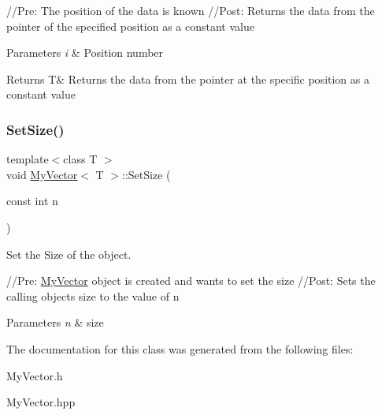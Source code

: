 //\+Pre\+: The position of the data is known //\+Post\+: Returns the data from the pointer of the specified position as a constant value 
\begin{DoxyParams}{Parameters}
{\em i} & Position number \\
\hline
\end{DoxyParams}
\begin{DoxyReturn}{Returns}
T\& Returns the data from the pointer at the specific position as a constant value 
\end{DoxyReturn}
\mbox{\label{class_my_vector_a54da580455b3348ddc47a6359e9db444}} 
\subsubsection{\texorpdfstring{SetSize()}{SetSize()}}
{\footnotesize\ttfamily template$<$class T $>$ \\
void \mbox{\hyperlink{class_my_vector}{My\+Vector}}$<$ T $>$\+::Set\+Size (\begin{DoxyParamCaption}\item[{const int}]{n }\end{DoxyParamCaption})}



Set the Size of the object. 

//\+Pre\+: \mbox{\hyperlink{class_my_vector}{My\+Vector}} object is created and want\textquotesingle{}s to set the size //\+Post\+: Sets the calling object\textquotesingle{}s size to the value of n 
\begin{DoxyParams}{Parameters}
{\em n} & size \\
\hline
\end{DoxyParams}


The documentation for this class was generated from the following files\+:\begin{DoxyCompactItemize}
\item 
My\+Vector.\+h\item 
My\+Vector.\+hpp\end{DoxyCompactItemize}
